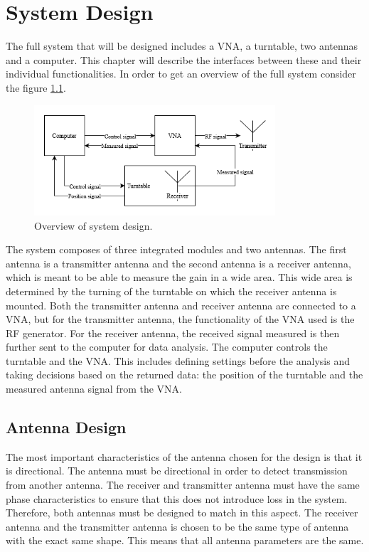 \chapter{System Design} \label{ch:design}
The full system that will be designed includes a VNA, a turntable, two antennas and a computer. This chapter will describe the interfaces between these and their individual functionalities. In order to get an overview of the full system consider the figure \ref{fig:system_design}.
\begin{figure}[H]
    \centering
    \includegraphics[width=0.8\textwidth]{figures/system_design.png}
    \caption{Overview of system design.} \label{fig:system_design}
\end{figure}
The system composes of three integrated modules and two antennas. The first antenna is a transmitter antenna and the second antenna is a receiver antenna, which is meant to be able to measure the gain in a wide area. This wide area is determined by the turning of the turntable on which the receiver antenna is mounted. Both the transmitter antenna and receiver antenna are connected to a VNA, but for the transmitter antenna, the functionality of the VNA used is the RF generator. For the receiver antenna, the received signal measured is then further sent to the computer for data analysis. The computer controls the turntable and the VNA. This includes defining settings before the analysis and taking decisions based on the returned data: the position of the turntable and the measured antenna signal from the VNA. 


\section{Antenna Design} \label{s:ant_design}
The most important characteristics of the antenna chosen for the design is that it is directional. The antenna must be directional in order to detect transmission from another antenna. The receiver and transmitter antenna must have the same phase characteristics to ensure that this does not introduce loss in the system. Therefore, both antennas must be designed to match in this aspect. The receiver antenna and the transmitter antenna is chosen to be the same type of antenna with the exact same shape. This means that all antenna parameters are the same. 

